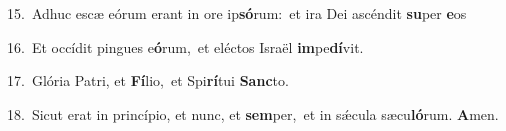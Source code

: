 {\numbfont\textcolor{\numbcolor}{15.}}~Adhuc escæ eórum erant in ore ip\-\textbf{só}\-rum:~\star et ira Dei ascéndit \textbf{su}\-per \textbf{e}\-os\par
{\numbfont\textcolor{\numbcolor}{16.}}~Et occídit pingues e\-\textbf{ó}\-rum,~\star et eléctos Israël \textbf{im}\-pe\-\textbf{dí}\-vit.\par
{\numbfont\textcolor{\numbcolor}{17.}}~Glória Patri, et \textbf{Fí}\-lio,~\star et Spi\-\textbf{rí}\-tui \textbf{Sanc}\-to.\par
{\numbfont\textcolor{\numbcolor}{18.}}~Sicut erat in princípio, et nunc, et \textbf{sem}\-per,~\star et in sǽcula sæcu\-\textbf{ló}\-rum. \textbf{A}\-men.\par
